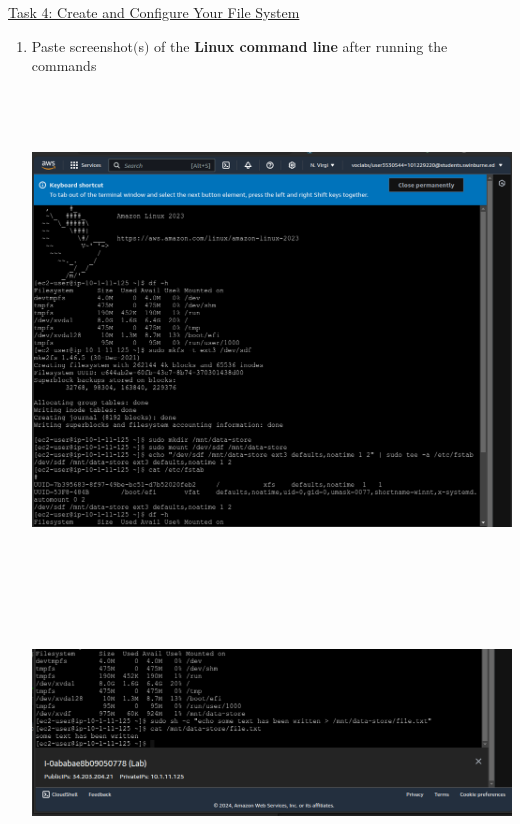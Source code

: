 \documentclass[11pt]{article}
\begin{document}
\vspace{7mm}

\noindent\underline{Task 4: Create and Configure Your File System}
\begin{enumerate}[resume]
    \item Paste screenshot$($s$)$ of the \textbf{Linux command line} after running the commands \\
    \vspace{5mm}

    {\centering
    \includegraphics[width=6.1in, height=5.2in]{pics/6a.png}
    }

    \vspace{-6.8mm}

    {\centering
    \includegraphics[width=6.1in, height=2.6in]{pics/6b.png}
    }


\end{enumerate}
\end{document}
